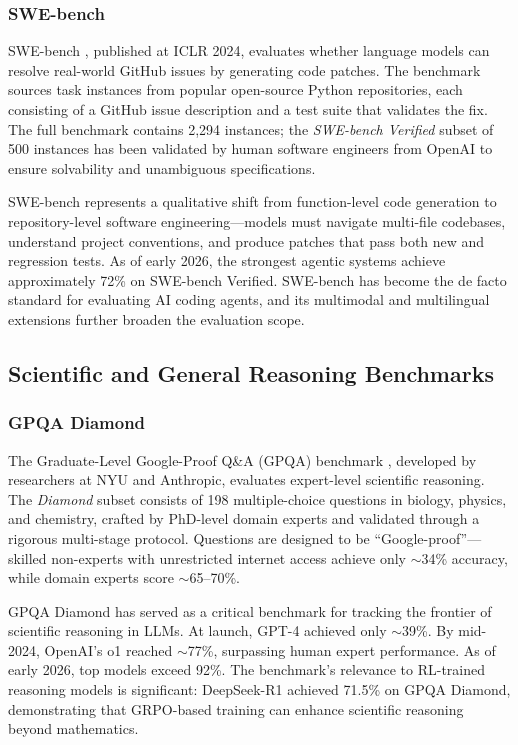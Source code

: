 \documentclass[12pt,a4paper]{report}
\begin{document}
\subsubsection{SWE-bench}

SWE-bench \cite{jimenez2024swebench}, published at ICLR 2024, evaluates whether language models can resolve real-world GitHub issues by generating code patches. The benchmark sources task instances from popular open-source Python repositories, each consisting of a GitHub issue description and a test suite that validates the fix. The full benchmark contains 2,294 instances; the \emph{SWE-bench Verified} subset of 500 instances has been validated by human software engineers from OpenAI to ensure solvability and unambiguous specifications.

SWE-bench represents a qualitative shift from function-level code generation to repository-level software engineering---models must navigate multi-file codebases, understand project conventions, and produce patches that pass both new and regression tests. As of early 2026, the strongest agentic systems achieve approximately 72\% on SWE-bench Verified. SWE-bench has become the de facto standard for evaluating AI coding agents, and its multimodal and multilingual extensions further broaden the evaluation scope.

\subsection{Scientific and General Reasoning Benchmarks}

\subsubsection{GPQA Diamond}

The Graduate-Level Google-Proof Q\&A (GPQA) benchmark \cite{rein2024gpqa}, developed by researchers at NYU and Anthropic, evaluates expert-level scientific reasoning. The \emph{Diamond} subset consists of 198 multiple-choice questions in biology, physics, and chemistry, crafted by PhD-level domain experts and validated through a rigorous multi-stage protocol. Questions are designed to be ``Google-proof''---skilled non-experts with unrestricted internet access achieve only $\sim$34\% accuracy, while domain experts score $\sim$65--70\%.

GPQA Diamond has served as a critical benchmark for tracking the frontier of scientific reasoning in LLMs. At launch, GPT-4 achieved only $\sim$39\%. By mid-2024, OpenAI's o1 reached $\sim$77\%, surpassing human expert performance. As of early 2026, top models exceed 92\%. The benchmark's relevance to RL-trained reasoning models is significant: DeepSeek-R1 achieved 71.5\% on GPQA Diamond, demonstrating that GRPO-based training can enhance scientific reasoning beyond mathematics.
\end{document}
